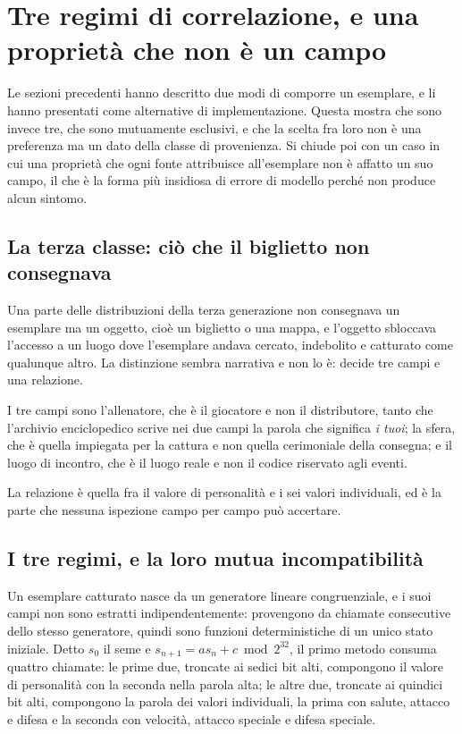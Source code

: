 \section{Tre regimi di correlazione, e una proprietà che non è un campo}
\label{sec:tre-regimi}

Le sezioni precedenti hanno descritto due modi di comporre un esemplare, e li hanno presentati come alternative di implementazione. Questa mostra che sono invece tre, che sono mutuamente esclusivi, e che la scelta fra loro non è una preferenza ma un dato della classe di provenienza. Si chiude poi con un caso in cui una proprietà che ogni fonte attribuisce all'esemplare non è affatto un suo campo, il che è la forma più insidiosa di errore di modello perché non produce alcun sintomo.

\subsection{La terza classe: ciò che il biglietto non consegnava}

Una parte delle distribuzioni della terza generazione non consegnava un esemplare ma un oggetto, cioè un biglietto o una mappa, e l'oggetto sbloccava l'accesso a un luogo dove l'esemplare andava cercato, indebolito e catturato come qualunque altro. La distinzione sembra narrativa e non lo è: decide tre campi e una relazione.

I tre campi sono l'allenatore, che è il giocatore e non il distributore, tanto che l'archivio enciclopedico scrive nei due campi la parola che significa \emph{i tuoi}; la sfera, che è quella impiegata per la cattura e non quella cerimoniale della consegna; e il luogo di incontro, che è il luogo reale e non il codice riservato agli eventi.

La relazione è quella fra il valore di personalità e i sei valori individuali, ed è la parte che nessuna ispezione campo per campo può accertare.

\subsection{I tre regimi, e la loro mutua incompatibilità}

Un esemplare catturato nasce da un generatore lineare congruenziale, e i suoi campi non sono estratti indipendentemente: provengono da chiamate consecutive dello stesso generatore, quindi sono funzioni deterministiche di un unico stato iniziale. Detto $s_0$ il seme e $s_{n+1} = a s_n + c \bmod 2^{32}$, il primo metodo consuma quattro chiamate: le prime due, troncate ai sedici bit alti, compongono il valore di personalità con la seconda nella parola alta; le altre due, troncate ai quindici bit alti, compongono la parola dei valori individuali, la prima con salute, attacco e difesa e la seconda con velocità, attacco speciale e difesa speciale.

